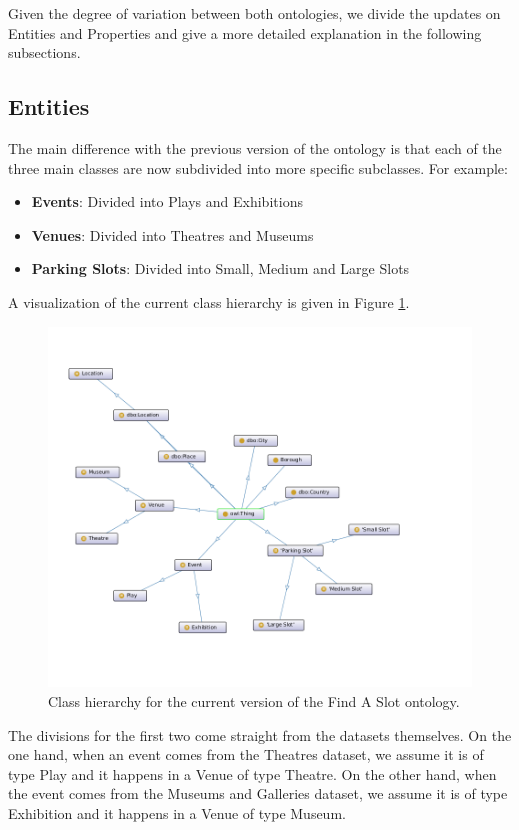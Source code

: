 \documentclass[runningheads,a4paper]{../../StyleFiles/llncs}
\begin{document}
Given the degree of variation between both ontologies, we divide the updates on Entities and Properties and give a more detailed explanation in the following subsections.

\subsection{Entities}
The main difference with the previous version of the ontology is that each of the three main classes are now subdivided into more specific subclasses. For example:
\begin{itemize}
	\item \textbf{Events}: Divided into Plays and Exhibitions
	\item \textbf{Venues}: Divided into Theatres and Museums
	\item \textbf{Parking Slots}: Divided into Small, Medium and Large Slots
\end{itemize}
A visualization of the current class hierarchy is given in Figure
\ref{fig:ontology-classes}.

\begin{figure}[h] \centering
	\includegraphics[width=.9\textwidth]{img/ontology-classes.png}
	\caption{Class hierarchy for the current version of the Find A Slot ontology.}
	\label{fig:ontology-classes}
\end{figure}

The divisions for the first two come straight from the datasets themselves. On the one hand, when an event comes from the Theatres dataset, we assume it is of type Play and it happens in a Venue of type Theatre. On the other hand, when the event comes from the Museums and Galleries dataset, we assume it is of type Exhibition and it happens in a Venue of type Museum.
\end{document}
